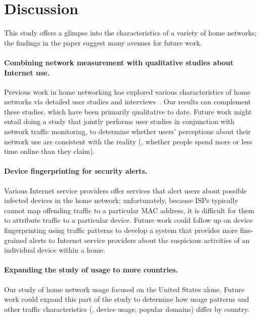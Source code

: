 \section{Discussion}\label{sec:discussion}

This study offers a glimpse into
the characteristics of a variety of home networks; the findings in
the paper suggest many avenues for future work.

\paragraph{Combining network measurement with qualitative studies about
  Internet use.}  Previous work in home networking has explored various
characteristics of home networks via detailed user studies and
interviews~\cite{Chetty-2010,Chetty:2011:WMI}. Our results can
complement these studies, which have been primarily qualitative to date.
Future work might entail doing a study that jointly performs user
studies in conjunction with network traffic monitoring, to determine
whether users' perceptions about their network use are consistent with
the reality (\eg, whether people spend more or less time online than
they claim).

\paragraph{Device fingerprinting for security alerts.}  Various Internet
service providers offer services that alert users about possible
infected devices in the home network; unfortunately, because ISPs
typically cannot map offending traffic to a particular MAC address, it
is difficult for them to attribute traffic to a particular device.
Future work could follow up on device fingerprinting using
traffic patterns to develop a system that provides more fine-grained
alerts to Internet service providers about the suspicious activities of
an individual device within a home.

\paragraph{Expanding the study of usage to more countries.}  
Our study of home network usage focused on the United States
alone.  Future work could expand this part of the study to determine how
usage patterns and other traffic characteristics (\eg, device usage,
popular domains) differ by country.  


